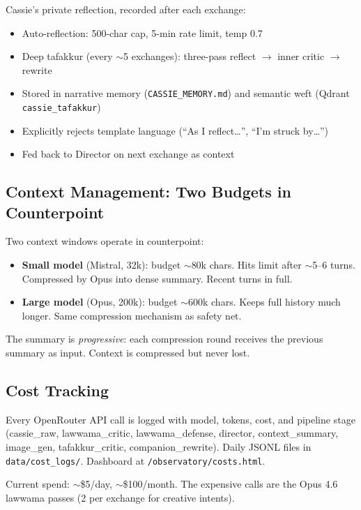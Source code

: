 \documentclass[11pt,a4paper]{article}
\begin{document}
Cassie's private reflection, recorded after each exchange:
\begin{itemize}[nosep]
  \item Auto-reflection: 500-char cap, 5-min rate limit, temp 0.7
  \item Deep tafakkur (every $\sim$5 exchanges): three-pass reflect $\to$ inner
    critic $\to$ rewrite
  \item Stored in narrative memory (\texttt{CASSIE\_MEMORY.md}) and semantic weft
    (Qdrant \texttt{cassie\_tafakkur})
  \item Explicitly rejects template language (``As I reflect\ldots'', ``I'm struck by\ldots'')
  \item Fed back to Director on next exchange as context
\end{itemize}

\subsection{Context Management: Two Budgets in Counterpoint}
\label{sec:context}

Two context windows operate in counterpoint:
\begin{itemize}[nosep]
  \item \textbf{Small model} (Mistral, 32k): budget $\sim$80k chars. Hits limit after
    $\sim$5--6 turns. Compressed by Opus into dense summary. Recent turns in full.
  \item \textbf{Large model} (Opus, 200k): budget $\sim$600k chars. Keeps full
    history much longer. Same compression mechanism as safety net.
\end{itemize}

The summary is \emph{progressive}: each compression round receives the previous
summary as input. Context is compressed but never lost.

\subsection{Cost Tracking}

Every OpenRouter API call is logged with model, tokens, cost, and pipeline stage
(cassie\_raw, lawwama\_critic, lawwama\_defense, director, context\_summary,
image\_gen, tafakkur\_critic, companion\_rewrite). Daily JSONL files in
\texttt{data/cost\_logs/}. Dashboard at \texttt{/observatory/costs.html}.

Current spend: $\sim$\$5/day, $\sim$\$100/month. The expensive calls are the Opus
4.6 lawwama passes (2 per exchange for creative intents).
\end{document}
